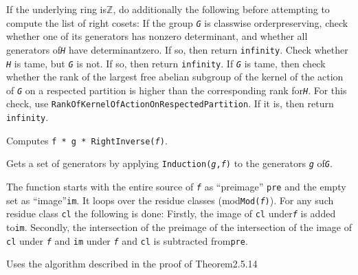 \documentclass[a4paper,11pt]{report}
\begin{document}
{\begin{description}
 If the underlying ring is{\nobreakspace}{\ensuremath{\mathbb Z}}, do
additionally the following before attempting to compute the list of right
cosets: If the group \mbox{\texttt{\mdseries\slshape G}} is class\texttt{}wise order\texttt{}preserving, check
whether one of its generators has nonzero determinant, and whether all
generators of{\nobreakspace}\mbox{\texttt{\mdseries\slshape H}} have determinant{\nobreakspace}zero. If so, then return \texttt{infinity}. Check whether \mbox{\texttt{\mdseries\slshape H}} is tame, but \mbox{\texttt{\mdseries\slshape G}} is not. If so, then return \texttt{infinity}. If \mbox{\texttt{\mdseries\slshape G}} is tame, then check whether the rank of the largest free abelian subgroup of
the kernel of the action of \mbox{\texttt{\mdseries\slshape G}} on a respected partition is higher than the corresponding rank
for{\nobreakspace}\mbox{\texttt{\mdseries\slshape H}}. For this check, use \texttt{RankOfKernelOfActionOnRespectedPartition}. If it is, then return \texttt{infinity}. 
\item[{ \texttt{Induction(\mbox{\texttt{\mdseries\slshape g}},\mbox{\texttt{\mdseries\slshape f}})} }]  Computes \texttt{f * g * RightInverse(\mbox{\texttt{\mdseries\slshape f}})}. 
\item[{ \texttt{Induction(\mbox{\texttt{\mdseries\slshape G}},\mbox{\texttt{\mdseries\slshape f}})} }]  Gets a set of generators by applying \texttt{Induction(\mbox{\texttt{\mdseries\slshape g}},\mbox{\texttt{\mdseries\slshape f}})} to the generators \mbox{\texttt{\mdseries\slshape g}} of{\nobreakspace}\mbox{\texttt{\mdseries\slshape G}}. 
\item[{ \texttt{InjectiveAsMappingFrom(\mbox{\texttt{\mdseries\slshape f}})} }]  The function starts with the entire source of \mbox{\texttt{\mdseries\slshape f}} as ``preimage'' \texttt{pre} and the empty set as ``image''{\nobreakspace}\texttt{im}. It loops over the residue classes (mod{\nobreakspace}\texttt{Mod(\mbox{\texttt{\mdseries\slshape f}})}). For any such residue class \texttt{cl} the following is done: Firstly, the image of \texttt{cl} under{\nobreakspace}\mbox{\texttt{\mdseries\slshape f}} is added to{\nobreakspace}\texttt{im}. Secondly, the intersection of the preimage of the intersection of the image
of \texttt{cl} under \mbox{\texttt{\mdseries\slshape f}} and \texttt{im} under \mbox{\texttt{\mdseries\slshape f}} and \texttt{cl} is subtracted from{\nobreakspace}\texttt{pre}. 
\item[{ \texttt{IntegralConjugate(\mbox{\texttt{\mdseries\slshape f}})}, {\nobreakspace} \texttt{IntegralConjugate(\mbox{\texttt{\mdseries\slshape G}})} }]  Uses the algorithm described in the proof of Theorem{\nobreakspace}2.5.14

\end{description}}
\end{document}
